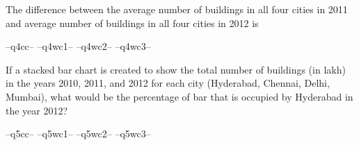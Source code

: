 \question   The difference between the average number of buildings in all four cities in 2011 and average number of buildings in all four cities in 2012 is

\begin{randomizechoices}
\correctchoice --q4cc-- 
\choice --q4wc1--  
\choice --q4wc2-- 
\choice --q4wc3-- 
\end{randomizechoices}

\question   If a stacked bar chart is created to show the total number of buildings (in lakh) in the years 2010, 2011, and 2012 for each city (Hyderabad, Chennai, Delhi, Mumbai), what would be the percentage of bar that is occupied by Hyderabad in the year 2012?

\begin{randomizechoices}
\correctchoice --q5cc-- 
\choice --q5wc1--  
\choice --q5wc2-- 
\choice --q5wc3-- 
\end{randomizechoices}
